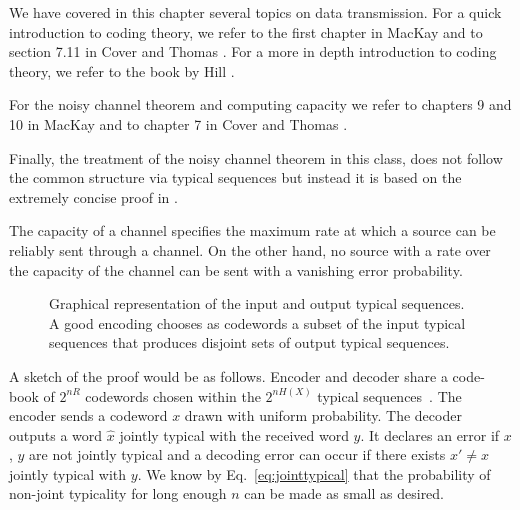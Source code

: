 We have covered in this chapter several topics on data transmission. For a quick introduction to coding theory, we refer to the first chapter in MacKay \cite{mackay2003information} and to section 7.11 in Cover and Thomas \cite{Cover_91}. For a more in depth introduction to coding theory, we refer to the book by Hill \cite{hill1986first}.

For the noisy channel theorem and computing capacity we refer to chapters 9 and 10 in MacKay \cite{mackay2003information} and to chapter 7 in Cover and Thomas \cite{Cover_91}. 

Finally, the treatment of the noisy channel theorem in this class, does not follow the common structure via typical sequences but instead it is based on the extremely concise proof in \cite{lomnitz2012simpler}.

\iffalse
{}

The capacity of a channel specifies the maximum rate at which a source can be reliably sent through a channel. On the other hand, no source with a rate over the capacity of the channel can be sent with a vanishing error probability.

\begin{figure}
\begin{center}
\def\svgwidth{\columnwidth} 
 
\caption[Jointly typical sequences]{Graphical representation of the input and output typical sequences. A good encoding chooses as codewords a subset of the input typical sequences that produces disjoint sets of output typical sequences.}
\label{fig:channel}
\end{center}
\end{figure}

A sketch of the proof would be as follows. Encoder and decoder share a code-book of $2^{nR}$ codewords chosen within the $2^{nH(X)}$ typical sequences~\cite{Massey_77}. The encoder sends a codeword ${x}$ drawn with uniform probability. The decoder outputs a word $\hat{{x}}$ jointly typical with the received word ${y}$. It declares an error if ${x}$, ${y}$ are not jointly typical and a decoding error can occur if there exists ${x}'\neq {x}$ jointly typical with ${y}$. We know by Eq.~\ref{eq:jointtypical} that the probability of non-joint typicality for long enough $n$ can be made as small as desired. %


